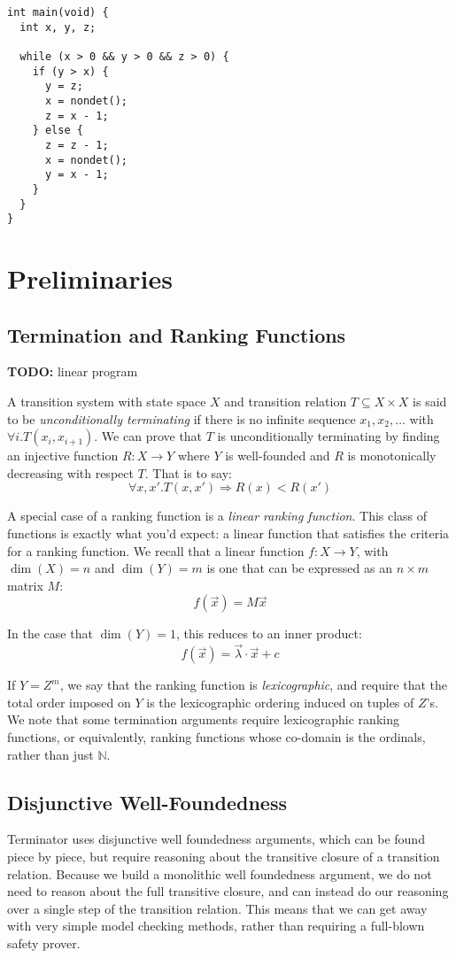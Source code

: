 \documentclass[preprint]{sigplanconf}
\theoremstyle{definition}
\newcommand{\todo}[1]{{\bf TODO:} #1}
\begin{document}
\begin{lstlisting}
int main(void) {
  int x, y, z;

  while (x > 0 && y > 0 && z > 0) {
    if (y > x) {
      y = z;
      x = nondet();
      z = x - 1;
    } else {
      z = z - 1;
      x = nondet();
      y = x - 1;
    }
  }
}
\end{lstlisting}



\section{Preliminaries}
\subsection{Termination and Ranking Functions} \label{sec:ranking.functions}
\todo{linear program}

A transition system with state space $X$ and transition relation $T \subseteq X \times X$
is said to be \emph{unconditionally terminating} if there is no infinite sequence
$x_1, x_2, \ldots$ with $\forall i . T(x_i, x_{i+1})$.  We can prove that $T$ is
unconditionally terminating by finding an injective function $R: X \to Y$ where
$Y$ is well-founded and $R$ is monotonically decreasing with respect $T$.  That is
to say:
$$\forall x, x' . T(x, x') \Rightarrow R(x) < R(x')$$

A special case of a ranking function is a \emph{linear ranking function}.  This
class of functions is exactly what you'd expect: a linear function that satisfies
the criteria for a ranking function.  We recall that a linear function $f: X \to Y$,
with $\dim(X) = n$ and $\dim(Y) = m$
is one that can be expressed as an $n \times m$ matrix $M$:
$$f(\vec{x}) = M\vec{x}$$

In the case that $\dim(Y) = 1$, this reduces to an inner product:
$$f(\vec{x}) = \vec{\lambda} \cdotp \vec{x} + c$$

If $Y = Z^m$, we say that the ranking function is \emph{lexicographic},
and require that the total order imposed on $Y$ is the lexicographic ordering
induced on tuples of $Z$'s.  We note that some termination arguments
require lexicographic ranking functions, or equivalently, ranking functions
whose co-domain is the ordinals, rather than just $\mathbb{N}$.

\subsection{Disjunctive Well-Foundedness}\label{sec:dwf}
Terminator uses disjunctive well foundedness arguments, which can be found
piece by piece, but require reasoning about the transitive closure of a transition
relation.  Because we build a monolithic well foundedness argument, we
do not need to reason about the full transitive closure, and can instead do our
reasoning over a single step of the transition relation.  This means that we
can get away with very simple model checking methods, rather than requiring
a full-blown safety prover.
\end{document}
